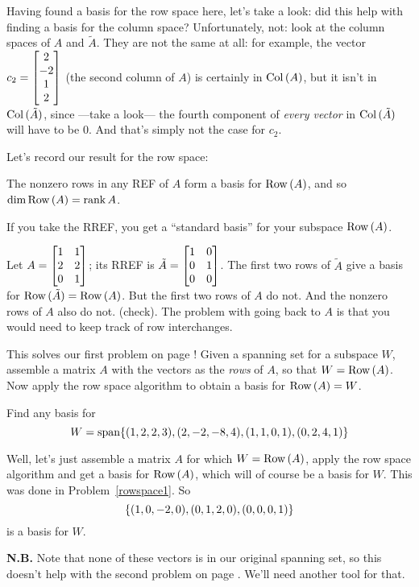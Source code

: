 Having found a basis for the row space here, let's take a look: did this help with finding a basis for the column space? Unfortunately, not: look at the column spaces of $A$ and $\tilde A$. They are not the same at all: for example, the vector
$
c_2= \left[ \begin{matrix} 
 2 \\ -2 \\ 1 \\ 2  \end{matrix} \right]
$ (the second column of $A$) is certainly in $\operatorname{Col\,}(A)$, but it isn't in $\operatorname{Col\,}(\tilde A)$, since ---take a look--- the fourth component of {\it every vector} in $\operatorname{Col\,}(\tilde A)$ will have to be $0$. And that's simply not the case for $c_2$.



Let's record our result for the row space:

\begin{theorem}\label{basisRowA}
The nonzero rows in any REF of $A$ form a basis for $\operatorname{Row\,}(A)$, and so $\dim \operatorname{Row\,}(A)=\operatorname{rank} A$.
\end{theorem}

If you take the RREF, you get a ``standard basis'' for your subspace $\operatorname{Row\,}(A)$.


\begin{myexample}
Let $A = \left[ \begin{matrix} 1&1\\2&2\\ 0&1 \end{matrix} \right]$; its RREF is $\tilde A=\left[ \begin{matrix} 1&0\\0&1\\0&0 \end{matrix} \right]$.
The first two rows of $\tilde A$ give a basis for $\operatorname{Row\,}(\tilde A)=\operatorname{Row\,}(A)$.  But
the first two rows of $A$ do not.  And the nonzero rows of $A$
also do not.  (check).  The problem with going back to $A$ is
that you would need to keep track of row interchanges.
\end{myexample}

This solves our first problem on page \pageref{FindingBases}! Given a spanning set for a subspace $W$, assemble a matrix $A$ with the vectors as the {\it rows} of $A$, so that $W=\operatorname{Row\,}(A)$. Now apply the row space algorithm to obtain a basis for $\operatorname{Row\,}(A)=W$.

\begin{myexample}
Find any basis for $$
W = \textrm{span}\{(1,2,2,3),(2,-2,-8,4),(1,1,0,1),(0,2,4,1)\}
$$

Well, let's just assemble a matrix $A$ for which $W=\operatorname{Row\,}(A)$, apply the row space algorithm and get a basis for $\operatorname{Row\,}(A)$, which will of course be a basis for $W$. This was done in Problem~\ref{rowspace1}.
So
$$\{(1,0,-2,0), (0,1,2,0), (0,0,0,1) \}$$ is a basis for $W$. 

{\bf N.B.} Note that none of these vectors is in our original spanning set, so this doesn't help with the second problem on page \pageref{FindingBases}. We'll need another tool for that.
\end{myexample}

